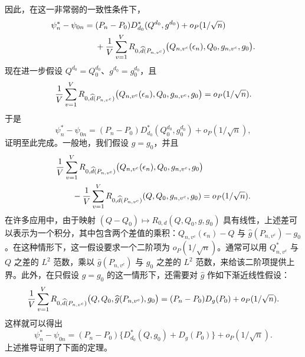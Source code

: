 因此，在这一非常弱的一致性条件下，
\[
\begin{aligned}
\psi_n^*-\psi_{0n}
={}&(P_n-P_0)D^*_{d_0}(Q^{d_0},g^{d_0})+o_P(1/\sqrt n)\\
&+\frac1V\sum_{v=1}^V R_{0,\widehat d(P_{n,v^c})}
 \bigl(Q_{n,v^c}(\epsilon_n),Q_0,g_{n,v^c},g_0\bigr).
\end{aligned}
\]
现在进一步假设 $Q^{d_0}=Q_0^{d_0}$、$g^{d_0}=g_0^{d_0}$，且
\[
\frac1V\sum_{v=1}^V R_{0,\widehat d(P_{n,v^c})}
 \bigl(Q_{n,v^c}(\epsilon_n),Q_0,g_{n,v^c},g_0\bigr)
 =o_P(1/\sqrt n).
\]
于是
\[
\psi_n^*-\psi_{0n}
 =(P_n-P_0)D^*_{d_0}(Q_0^{d_0},g_0^{d_0})+o_P(1/\sqrt n),
\]
证明至此完成。一般地，我们假设 $g=g_0$，并且
\[
\begin{aligned}
&\frac1V\sum_{v=1}^V R_{0,\widehat d(P_{n,v^c})}
 \bigl(Q_{n,v^c}(\epsilon_n),Q_0,g_{n,v^c},g_0\bigr)\\
&\qquad-\frac1V\sum_{v=1}^V R_{0,\widehat d(P_{n,v^c})}(Q,Q_0,g_{n,v^c},g_0)
 =o_P(1/\sqrt n).
\end{aligned}
\]
在许多应用中，由于映射 $(Q-Q_0)\mapsto R_{0,d}(Q,Q_0,g,g_0)$ 具有线性，上述差可以表示为一个积分，其中包含两个差值的乘积：$Q_{n,v^c}(\epsilon_n)-Q$ 与 $\widehat g(P_{n,v^c})-g_0$。在这种情形下，这一假设要求一个二阶项为 $o_P(1/\sqrt n)$。通常可以用 $Q_{n,v^c}^*$ 与 $Q$ 之差的 $L^2$ 范数，乘以 $\widehat g(P_{n,v^c})$ 与 $g_0$ 之差的 $L^2$ 范数，来给该二阶项提供上界。此外，在只假设 $g=g_0$ 的这一情形下，还需要对 $\widehat g$ 作如下渐近线性假设：
\[
\frac1V\sum_{v=1}^V R_{0,\widehat d(P_{n,v^c})}
 \bigl(Q,Q_0,\widehat g(P_{n,v^c}),g_0\bigr)
 =(P_n-P_0)D_g(P_0)+o_P(1/\sqrt n).
\]
这样就可以得出
\[
\psi_n^*-\psi_{0n}
 =(P_n-P_0)\{D^*_{d_0}(Q,g_0)+D_g(P_0)\}+o_P(1/\sqrt n).
\]
上述推导证明了下面的定理。

